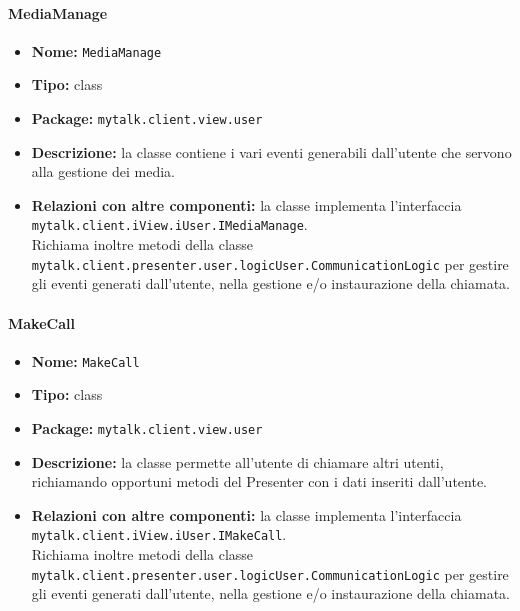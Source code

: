 {{\paragraph{MediaManage}{
	\begin{itemize}
		\item [] \textbf{Nome:} \texttt{MediaManage}
		\item [] \textbf{Tipo:} class
		\item [] \textbf{Package:} \texttt{mytalk.client.view.user}
		\item [] \textbf{Descrizione:} la classe contiene i vari eventi generabili dall'utente che servono alla gestione dei media.
		\item [] \textbf{Relazioni con altre componenti:} la classe implementa l'interfaccia\\ \texttt{mytalk.client.iView.iUser.IMediaManage}.\\
		Richiama inoltre metodi della classe \\ \texttt{mytalk.client.presenter.user.logicUser.CommunicationLogic} per gestire gli eventi generati dall'utente, nella gestione e/o instaurazione della chiamata.
	\end{itemize}
}
\paragraph{MakeCall}{
	\begin{itemize}
		\item [] \textbf{Nome:} \texttt{MakeCall}
		\item [] \textbf{Tipo:} class
		\item [] \textbf{Package:} \texttt{mytalk.client.view.user}
		\item [] \textbf{Descrizione:} la classe permette all'utente di chiamare altri utenti, richiamando opportuni metodi del Presenter con i dati inseriti dall'utente.
		\item [] \textbf{Relazioni con altre componenti:} la classe implementa l'interfaccia\\ \texttt{mytalk.client.iView.iUser.IMakeCall}.\\
		Richiama inoltre metodi della classe \\ \texttt{mytalk.client.presenter.user.logicUser.CommunicationLogic} per gestire gli eventi generati dall'utente, nella gestione e/o instaurazione della chiamata.
	\end{itemize}
}
} %
} %





